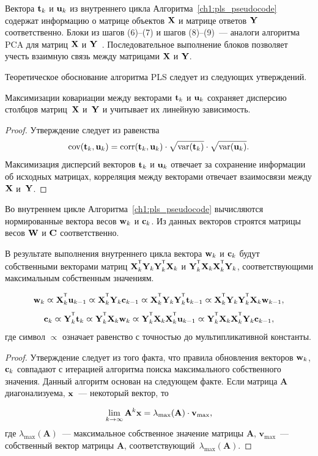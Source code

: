 Вектора $\mathbf{t}_k$ и $\mathbf{u}_k$ из внутреннего цикла Алгоритма~\ref{ch1:pls_pseudocode}
содержат информацию о матрице объектов $\mathbf{X}$ и матрице ответов $\mathbf{Y}$ соответственно. 
Блоки из шагов (6)--(7) и шагов (8)--(9)~--- аналоги алгоритма PCA для матриц $\mathbf{X}$ и $\mathbf{Y}$~\cite{geladi1988pls}. 
Последовательное выполнение блоков позволяет учесть взаимную связь между матрицами $\mathbf{X}$ и $\mathbf{Y}$.

Теоретическое обоснование алгоритма PLS следует из следующих утверждений.
\begin{statement}
	Максимизации ковариации между векторами $\mathbf{t}_k$ и $\mathbf{u}_k$ сохраняет дисперсию столбцов матриц~$\mathbf{X}$ и~$\mathbf{Y}$ и учитывает их линейную зависимость.
\end{statement}
\begin{proof}
	Утверждение следует из равенства
	\[
	\text{cov} (\mathbf{t}_k, \mathbf{u}_k) = \text{corr} (\mathbf{t}_k, \mathbf{u}_k) \cdot \sqrt{\text{var}(\mathbf{t}_k)} \cdot \sqrt{\text{var}(\mathbf{u}_k)}.
	\]
	Максимизация дисперсий векторов $\mathbf{t}_k$ и $\mathbf{u}_k$ отвечает за сохранение информации об исходных матрицах, 
	корреляция между векторами отвечает взаимосвязи между $\mathbf{X}$ и~$\mathbf{Y}$. 
\end{proof}

Во внутреннем цикле Алгоритма~\ref{ch1:pls_pseudocode} вычисляются нормированные вектора весов $\mathbf{w}_k$ и $\mathbf{c}_k$. 
Из данных векторов строятся матрицы весов $\mathbf{W}$ и $\mathbf{C}$ соответственно.

\begin{statement}
	В результате выполнения внутреннего цикла вектора $\mathbf{w}_k$ и $\mathbf{c}_k$ будут собственными векторами матриц $\bX_k^{\T} \bY_k \bY_k^{\T} \bX_k$ и $\bY_k^{\T} \bX_k \bX_k^{\T} \bY_k$, соответствующими максимальным собственным значениям.
	
	\begin{equation*}
		\bw_k \varpropto \bX_k^{\T} \bu_{k-1} \varpropto \bX_k^{\T} \bY_k \bc_{k-1} \varpropto \bX_k^{\T} \bY_k \bY_k^{\T} \bt_{k-1} \varpropto \bX_k^{\T} \bY_k \bY_k^{\T} \bX_k \bw_{k-1},
	\end{equation*}
	\begin{equation*}
		\bc_k \varpropto \bY_k^{\T} \bt_k \varpropto \bY_k^{\T} \bX_k \bw_k \varpropto \bY_k^{\T} \bX_k \bX_k^{\T} \bu_{k-1} \varpropto \bY_k^{\T} \bX_k \bX_k^{\T} \bY_k \bc_{k-1},
	\end{equation*}
	где символ $\varpropto$ означает равенство с точностью до мультипликативной константы. 
	\label{st:eig}
\end{statement}
\begin{proof}
	Утверждение следует из того факта, что правила обновления векторов $\mathbf{w}_k$, $\mathbf{c}_k$ совпадают с итерацией алгоритма поиска максимального собственного значения. 
	Данный алгоритм основан на следующем факте.
	Если матрица $\mathbf{A}$ диагонализуема, $\mathbf{x}$~--- некоторый вектор, то
	
	\[
	\lim_{k \rightarrow \infty} \mathbf{A}^k \mathbf{x} = \lambda_{\max}(\mathbf{A}) \cdot \mathbf{v}_{\max},
	\]
	где $ \lambda_{\max} (\mathbf{A})$~--- максимальное собственное значение матрицы $\mathbf{A}$, $\mathbf{v}_{\max}$~---собственный вектор матрицы $\mathbf{A}$, соответствующий~$\lambda_{\max} (\mathbf{A})$.
	
\end{proof}

